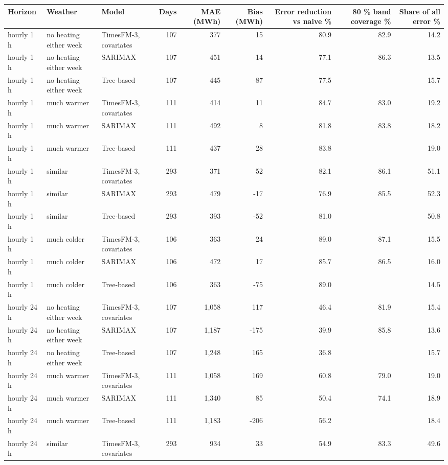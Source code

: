 \begin{tabular}{lllrrrrrr}
\toprule
Horizon & Weather & Model & Days & MAE (MWh) & Bias (MWh) & Error reduction vs naive \% & 80 \% band coverage \% & Share of all error \% \\
\midrule
hourly 1 h & no heating either week & TimesFM-3, covariates & 107 & 377 & 15 & 80.9 & 82.9 & 14.2 \\
hourly 1 h & no heating either week & SARIMAX & 107 & 451 & -14 & 77.1 & 86.3 & 13.5 \\
hourly 1 h & no heating either week & Tree-based & 107 & 445 & -87 & 77.5 &  & 15.7 \\
hourly 1 h & much warmer & TimesFM-3, covariates & 111 & 414 & 11 & 84.7 & 83.0 & 19.2 \\
hourly 1 h & much warmer & SARIMAX & 111 & 492 & 8 & 81.8 & 83.8 & 18.2 \\
hourly 1 h & much warmer & Tree-based & 111 & 437 & 28 & 83.8 &  & 19.0 \\
hourly 1 h & similar & TimesFM-3, covariates & 293 & 371 & 52 & 82.1 & 86.1 & 51.1 \\
hourly 1 h & similar & SARIMAX & 293 & 479 & -17 & 76.9 & 85.5 & 52.3 \\
hourly 1 h & similar & Tree-based & 293 & 393 & -52 & 81.0 &  & 50.8 \\
hourly 1 h & much colder & TimesFM-3, covariates & 106 & 363 & 24 & 89.0 & 87.1 & 15.5 \\
hourly 1 h & much colder & SARIMAX & 106 & 472 & 17 & 85.7 & 86.5 & 16.0 \\
hourly 1 h & much colder & Tree-based & 106 & 363 & -75 & 89.0 &  & 14.5 \\
hourly 24 h & no heating either week & TimesFM-3, covariates & 107 & 1,058 & 117 & 46.4 & 81.9 & 15.4 \\
hourly 24 h & no heating either week & SARIMAX & 107 & 1,187 & -175 & 39.9 & 85.8 & 13.6 \\
hourly 24 h & no heating either week & Tree-based & 107 & 1,248 & 165 & 36.8 &  & 15.7 \\
hourly 24 h & much warmer & TimesFM-3, covariates & 111 & 1,058 & 169 & 60.8 & 79.0 & 19.0 \\
hourly 24 h & much warmer & SARIMAX & 111 & 1,340 & 85 & 50.4 & 74.1 & 18.9 \\
hourly 24 h & much warmer & Tree-based & 111 & 1,183 & -206 & 56.2 &  & 18.4 \\
hourly 24 h & similar & TimesFM-3, covariates & 293 & 934 & 33 & 54.9 & 83.3 & 49.6 \\

\end{tabular}
